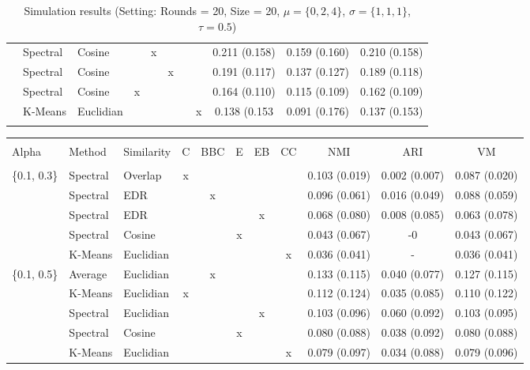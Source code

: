 \documentclass[12pt,a4paper,bibliography=totocnumbered,listof=totocnumbered]{scrartcl}
\begin{document}
\begin{appendix}
\begin{table}[!htbp]
\begin{tabularx}{\textwidth}{ lllcccccccc}
	& Spectral & Cosine &  & x &  &  &  & 0.211 (0.158) & 0.159 (0.160) & 0.210 (0.158) \\ 
	& Spectral & Cosine &  &  & x &  &  & 0.191 (0.117) & 0.137 (0.127) & 0.189 (0.118) \\ 
	& Spectral & Cosine & x &  &  &  &  & 0.164 (0.110) & 0.115 (0.109) & 0.162 (0.109) \\ 
	& K-Means & Euclidian &  &  &  &  & x & 0.138 (0.153 & 0.091 (0.176) & 0.137 (0.153) \\
	\hline \\[-1.8ex] 
	\end{tabularx} 
	\caption{Simulation results (Setting: Rounds = 20, Size = 20, $\mu = \{0,2,4\}$, $\sigma =  \{1,1,1\}$, $\tau = 0.5$)} 
\end{table} 

\begin{table}[!htbp] \centering 
	\label{} 
	\scriptsize
	\begin{tabularx}{\textwidth}{ lllcccccccc} \\
		\\[-1.8ex]	\toprule
		\\[-1.8ex] 
		Alpha & Method & Similarity & C & BBC & E & EB & CC & NMI & ARI & VM \\ 
		\hline \\[-1.8ex] 
\{0.1, 0.3\} & Spectral  & Overlap & x &  &  &  &  & 0.103 (0.019) & 0.002 (0.007) & 0.087 (0.020) \\ 
& Spectral  & EDR &  & x &  &  &  & 0.096 (0.061) & 0.016 (0.049) & 0.088 (0.059) \\ 
& Spectral  & EDR &  &  &  & x &  & 0.068 (0.080) & 0.008 (0.085) & 0.063 (0.078) \\ 
& Spectral  & Cosine &  &  & x &  &  & 0.043 (0.067) & -0 & 0.043 (0.067) \\ 
& K-Means & Euclidian  &  &  &  &  & x & 0.036 (0.041) &  -  & 0.036 (0.041) \\ 
\{0.1, 0.5\} & Average & Euclidian  &  & x &  &  &  & 0.133 (0.115) & 0.040 (0.077) & 0.127 (0.115) \\ 
& K-Means & Euclidian  & x &  &  &  &  & 0.112 (0.124) & 0.035 (0.085) & 0.110 (0.122) \\ 
& Spectral  & Euclidian  &  &  &  & x &  & 0.103 (0.096) & 0.060 (0.092) & 0.103 (0.095) \\ 
& Spectral  & Cosine &  &  & x &  &  & 0.080 (0.088) & 0.038 (0.092) & 0.080 (0.088) \\ 
& K-Means & Euclidian  &  &  &  &  & x & 0.079 (0.097) & 0.034 (0.088) & 0.079 (0.096) \\ 

\end{tabularx}
\end{table}
\end{appendix}
\end{document}
